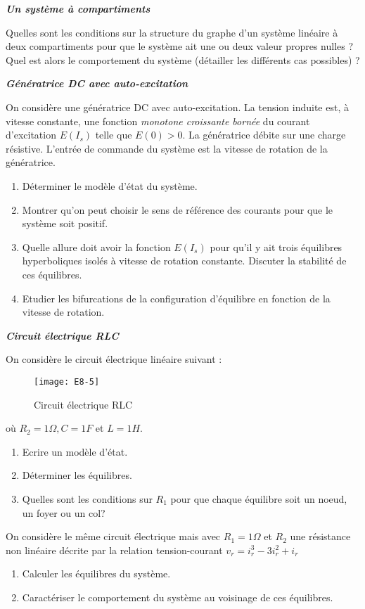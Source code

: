 \begin{exercice} {\bf \em Un système à compartiments}

Quelles sont les conditions sur la structure du graphe d'un
système linéaire à deux compartiments pour que le système ait
une ou deux valeur propres nulles ? Quel est alors le comportement du
système (détailler les différents cas possibles) ?
\end{exercice}
\vv

\begin{exercice}{\bf \em Génératrice DC avec auto-excitation}

On considère une génératrice DC avec auto-excitation. La tension induite est, à vitesse constante, une fonction {\em monotone
croissante bornée} du courant d'excitation $E(I_s)$ telle que $E(0) >
0$. La génératrice débite sur une charge résistive. L'entrée de
commande du système est la vitesse de rotation de la
génératrice.
\begin{enumerate}
\item Déterminer le modèle d'état du système.
\item Montrer qu'on peut choisir le sens de référence des courants pour que le système soit positif.
\item Quelle allure doit avoir la fonction $E(I_s)$ pour qu'il y ait trois
équilibres hyperboliques isolés à vitesse de rotation constante. Discuter la
stabilité de ces équilibres.
\item Etudier les bifurcations de la configuration d'équilibre en fonction de la vitesse de rotation.
\end{enumerate}
\end{exercice}
\vv

\begin{exercice} {\bf \em Circuit électrique RLC} 

On considère le circuit électrique linéaire suivant :
\begin{figure}[h] 
   \centering
   \texttt{[image: E8-5]} 
   \caption{Circuit électrique RLC}
   \label{fig:E8-5}
\end{figure}

où $R_2 = 1\Omega, C = 1F$ et $L = 1H$.

\begin{enumerate}
\item Ecrire un modèle d'état.
\item Déterminer les équilibres.
\item Quelles sont les conditions sur $R_1$ pour que chaque équilibre soit un
noeud, un foyer ou un col?
\end{enumerate}

On considère le même circuit électrique mais avec $R_1 = 1\Omega$ et $R_2$ une résistance non
linéaire décrite par la relation tension-courant $v_r = i^3_r - 3i^2_r + i_r$
\begin{enumerate}
\item Calculer les équilibres du système.
\item Caractériser le comportement du système au voisinage de ces équilibres.
\end{enumerate}
\end{exercice}
\vv 


